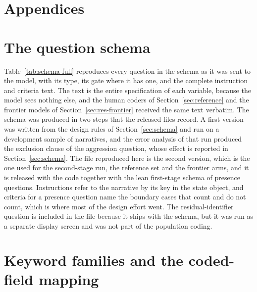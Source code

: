 \appendix
\renewcommand{\thetable}{\thesection.\arabic{table}}
\renewcommand{\thefigure}{\thesection.\arabic{figure}}
\renewcommand{\theequation}{\thesection.\arabic{equation}}

\section*{Appendices}

\section{The question schema}
\label{app:schema}
\setcounter{table}{0}\setcounter{figure}{0}\setcounter{equation}{0}

Table~\ref{tab:schema-full} reproduces every question in the schema as it was sent to the
model, with its type, its gate where it has one, and the complete instruction and criteria
text. The text is the entire specification of each variable, because the model sees nothing
else, and the human coders of Section~\ref{sec:reference} and the frontier models of
Section~\ref{sec:res-frontier} received the same text verbatim. The schema was produced in two steps that the released files record. A first version was written from the design rules of Section~\ref{sec:schema} and
run on a development sample of \SchemaValidateCompared{} narratives, and the error analysis of
that run produced the exclusion clause of the aggression question, whose effect is reported
in Section~\ref{sec:schema}. The file reproduced here is the second version, which is the one
used for the second-stage run, the reference set and the frontier arms, and it is released
with the code together with the lean first-stage schema of \NLeanQuestions{} presence
questions. Instructions refer to the narrative by its key in the state object, and criteria
for a presence question name the boundary cases that count and do not count, which is where
most of the design effort went. The residual-identifier question is included in the file
because it ships with the schema, but it was run as a separate display screen and was not part
of the population coding.



\section{Keyword families and the coded-field mapping}
\label{app:keywords}
\setcounter{table}{0}\setcounter{figure}{0}\setcounter{equation}{0}

